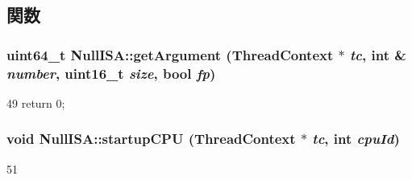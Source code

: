 \subsection{関数}
\hypertarget{namespaceNullISA_a9f821ddebea7f029e0889ac47e32f84e}{
\subsubsection[{getArgument}]{\setlength{\rightskip}{0pt plus 5cm}uint64\_\-t NullISA::getArgument ({\bf ThreadContext} $\ast$ {\em tc}, \/  int \& {\em number}, \/  uint16\_\-t {\em size}, \/  bool {\em fp})}}
\label{namespaceNullISA_a9f821ddebea7f029e0889ac47e32f84e}



\begin{DoxyCode}
49                                      { return 0; }
\end{DoxyCode}
\hypertarget{namespaceNullISA_afba1e99c05313c7755d6377ed098e8e1}{
\subsubsection[{startupCPU}]{\setlength{\rightskip}{0pt plus 5cm}void NullISA::startupCPU ({\bf ThreadContext} $\ast$ {\em tc}, \/  int {\em cpuId})}}
\label{namespaceNullISA_afba1e99c05313c7755d6377ed098e8e1}



\begin{DoxyCode}
51 {}
\end{DoxyCode}


